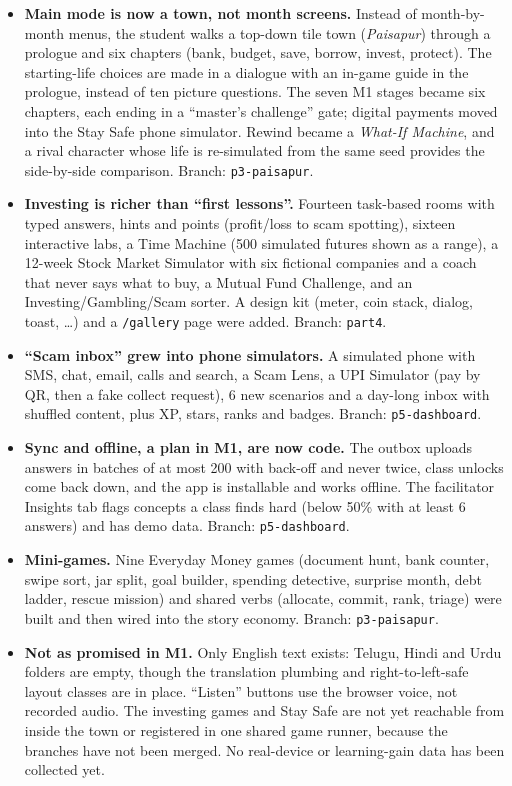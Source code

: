 \documentclass[10pt,a4paper]{article}
\begin{document}
\begin{itemize}
  \item \textbf{Main mode is now a town, not month screens.} Instead of month-by-month menus, the student walks a top-down tile town (\emph{Paisapur}) through a prologue and six chapters (bank, budget, save, borrow, invest, protect). The starting-life choices are made in a dialogue with an in-game guide in the prologue, instead of ten picture questions. The seven M1 stages became six chapters, each ending in a ``master's challenge'' gate; digital payments moved into the Stay Safe phone simulator. Rewind became a \emph{What-If Machine}, and a rival character whose life is re-simulated from the same seed provides the side-by-side comparison. Branch: \texttt{p3-paisapur}.
  \item \textbf{Investing is richer than ``first lessons''.} Fourteen task-based rooms with typed answers, hints and points (profit/loss to scam spotting), sixteen interactive labs, a Time Machine (500 simulated futures shown as a range), a 12-week Stock Market Simulator with six fictional companies and a coach that never says what to buy, a Mutual Fund Challenge, and an Investing/Gambling/Scam sorter. A design kit (meter, coin stack, dialog, toast, \ldots) and a \texttt{/gallery} page were added. Branch: \texttt{part4}.
  \item \textbf{``Scam inbox'' grew into phone simulators.} A simulated phone with SMS, chat, email, calls and search, a Scam Lens, a UPI Simulator (pay by QR, then a fake collect request), 6 new scenarios and a day-long inbox with shuffled content, plus XP, stars, ranks and badges. Branch: \texttt{p5-dashboard}.
  \item \textbf{Sync and offline, a plan in M1, are now code.} The outbox uploads answers in batches of at most 200 with back-off and never twice, class unlocks come back down, and the app is installable and works offline. The facilitator Insights tab flags concepts a class finds hard (below 50\% with at least 6 answers) and has demo data. Branch: \texttt{p5-dashboard}.
  \item \textbf{Mini-games.} Nine Everyday Money games (document hunt, bank counter, swipe sort, jar split, goal builder, spending detective, surprise month, debt ladder, rescue mission) and shared verbs (allocate, commit, rank, triage) were built and then wired into the story economy. Branch: \texttt{p3-paisapur}.
  \item \textbf{Not as promised in M1.} Only English text exists: Telugu, Hindi and Urdu folders are empty, though the translation plumbing and right-to-left-safe layout classes are in place. ``Listen'' buttons use the browser voice, not recorded audio. The investing games and Stay Safe are not yet reachable from inside the town or registered in one shared game runner, because the branches have not been merged. No real-device or learning-gain data has been collected yet.
\end{itemize}
\end{document}
